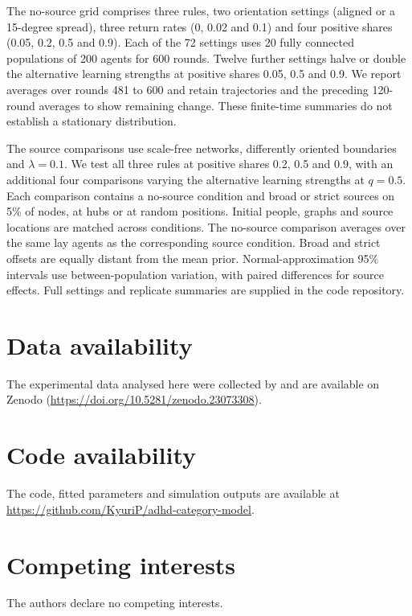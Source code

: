 \documentclass[11pt]{article}
\newcommand{\todo}[1]{\textcolor{red}{[#1]}}
\begin{document}
The no-source grid comprises three rules, two orientation settings (aligned or a 15-degree spread), three return rates (0, 0.02 and 0.1) and four positive shares (0.05, 0.2, 0.5 and 0.9). Each of the 72 settings uses 20 fully connected populations of 200 agents for 600 rounds. Twelve further settings halve or double the alternative learning strengths at positive shares 0.05, 0.5 and 0.9. We report averages over rounds 481 to 600 and retain trajectories and the preceding 120-round averages to show remaining change. These finite-time summaries do not establish a stationary distribution.

The source comparisons use scale-free networks, differently oriented boundaries and $\lambda=0.1$. We test all three rules at positive shares 0.2, 0.5 and 0.9, with an additional four comparisons varying the alternative learning strengths at $q=0.5$. Each comparison contains a no-source condition and broad or strict sources on 5\% of nodes, at hubs or at random positions. Initial people, graphs and source locations are matched across conditions. The no-source comparison averages over the same lay agents as the corresponding source condition. Broad and strict offsets are equally distant from the mean prior. Normal-approximation 95\% intervals use between-population variation, with paired differences for source effects. Full settings and replicate summaries are supplied in the code repository.

\section*{Data availability}

The experimental data analysed here were collected by \citet{katiyar2026} and are available on Zenodo (\url{https://doi.org/10.5281/zenodo.23073308}).

\section*{Code availability}

The code, fitted parameters and simulation outputs are available at \url{https://github.com/KyuriP/adhd-category-model}.





\section*{Competing interests}

The authors declare no competing interests.

\begingroup\small


\endgroup


\end{document}

